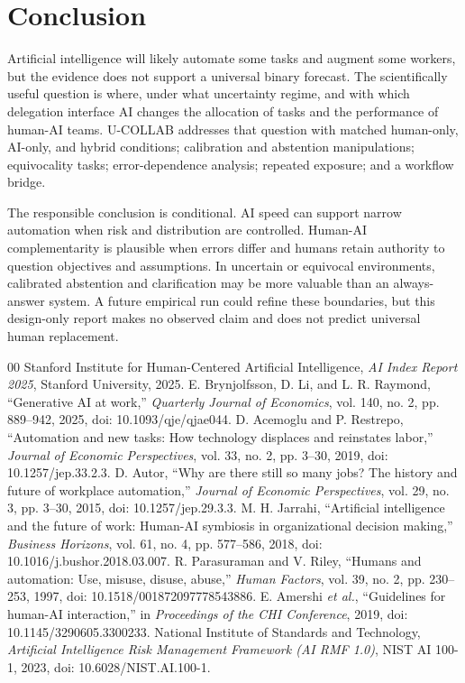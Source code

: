 \documentclass[conference]{IEEEtran}
\begin{document}
\section{Conclusion}

Artificial intelligence will likely automate some tasks and augment some workers, but the evidence does not support a universal binary forecast. The scientifically useful question is where, under what uncertainty regime, and with which delegation interface AI changes the allocation of tasks and the performance of human-AI teams. U-COLLAB addresses that question with matched human-only, AI-only, and hybrid conditions; calibration and abstention manipulations; equivocality tasks; error-dependence analysis; repeated exposure; and a workflow bridge.

The responsible conclusion is conditional. AI speed can support narrow automation when risk and distribution are controlled. Human-AI complementarity is plausible when errors differ and humans retain authority to question objectives and assumptions. In uncertain or equivocal environments, calibrated abstention and clarification may be more valuable than an always-answer system. A future empirical run could refine these boundaries, but this design-only report makes no observed claim and does not predict universal human replacement.

\balance
\begin{thebibliography}{00}
 Stanford Institute for Human-Centered Artificial Intelligence, \emph{AI Index Report 2025}, Stanford University, 2025.
 E. Brynjolfsson, D. Li, and L. R. Raymond, ``Generative AI at work,'' \emph{Quarterly Journal of Economics}, vol. 140, no. 2, pp. 889--942, 2025, doi: 10.1093/qje/qjae044.
 D. Acemoglu and P. Restrepo, ``Automation and new tasks: How technology displaces and reinstates labor,'' \emph{Journal of Economic Perspectives}, vol. 33, no. 2, pp. 3--30, 2019, doi: 10.1257/jep.33.2.3.
 D. Autor, ``Why are there still so many jobs? The history and future of workplace automation,'' \emph{Journal of Economic Perspectives}, vol. 29, no. 3, pp. 3--30, 2015, doi: 10.1257/jep.29.3.3.
 M. H. Jarrahi, ``Artificial intelligence and the future of work: Human-AI symbiosis in organizational decision making,'' \emph{Business Horizons}, vol. 61, no. 4, pp. 577--586, 2018, doi: 10.1016/j.bushor.2018.03.007.
 R. Parasuraman and V. Riley, ``Humans and automation: Use, misuse, disuse, abuse,'' \emph{Human Factors}, vol. 39, no. 2, pp. 230--253, 1997, doi: 10.1518/001872097778543886.
 E. Amershi \emph{et al.}, ``Guidelines for human-AI interaction,'' in \emph{Proceedings of the CHI Conference}, 2019, doi: 10.1145/3290605.3300233.
 National Institute of Standards and Technology, \emph{Artificial Intelligence Risk Management Framework (AI RMF 1.0)}, NIST AI 100-1, 2023, doi: 10.6028/NIST.AI.100-1.
\end{thebibliography}
\end{document}
